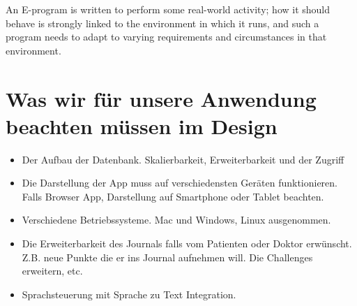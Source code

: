 An E-program is written to perform some real-world activity; how it should behave is strongly linked to the environment in which it runs, and such a program needs to adapt to varying requirements and circumstances in that environment.

\section{Was wir für unsere Anwendung beachten müssen im Design}

\begin{itemize}
    \item{Der Aufbau der Datenbank. Skalierbarkeit, Erweiterbarkeit und der Zugriff}
    \item{Die Darstellung der App muss auf verschiedensten Geräten funktionieren. Falls Browser App, Darstellung auf Smartphone oder Tablet beachten.}
    \item{Verschiedene Betriebssysteme. Mac und Windows, Linux ausgenommen.}
    \item{Die Erweiterbarkeit des Journals falls vom Patienten oder Doktor erwünscht. Z.B. neue Punkte die er ins Journal aufnehmen will. Die Challenges erweitern, etc.}
    \item{Sprachsteuerung mit Sprache zu Text Integration.}
\end{itemize}

